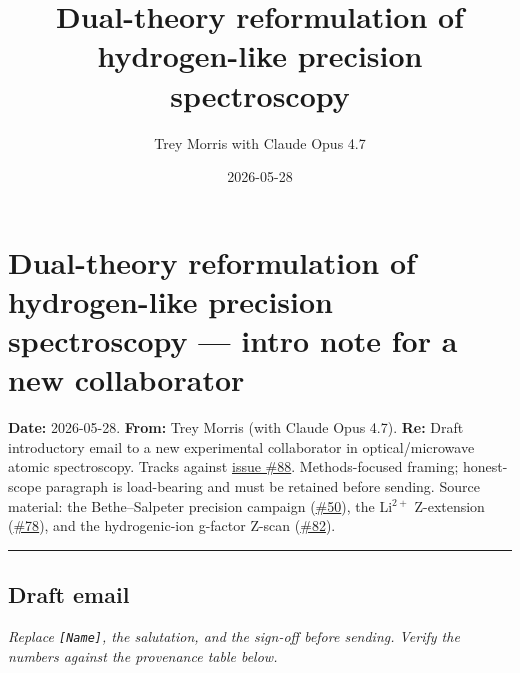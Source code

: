 \documentclass[
  11pt,
]{article}
\title{Dual-theory reformulation of hydrogen-like precision
spectroscopy}
\author{Trey Morris with Claude Opus 4.7}
\date{2026-05-28}
\begin{document}
\maketitle

\hypertarget{dual-theory-reformulation-of-hydrogen-like-precision-spectroscopy-intro-note-for-a-new-collaborator}{%
\section{Dual-theory reformulation of hydrogen-like precision
spectroscopy --- intro note for a new
collaborator}\label{dual-theory-reformulation-of-hydrogen-like-precision-spectroscopy-intro-note-for-a-new-collaborator}}

\textbf{Date:} 2026-05-28. \textbf{From:} Trey Morris (with Claude Opus
4.7). \textbf{Re:} Draft introductory email to a new experimental
collaborator in optical/microwave atomic spectroscopy. Tracks against
\href{https://github.com/temoTxt/PyPhysics/issues/88}{issue \#88}.
Methods-focused framing; honest-scope paragraph is load-bearing and must
be retained before sending. Source material: the Bethe--Salpeter
precision campaign
(\href{https://github.com/temoTxt/PyPhysics/issues/50}{\#50}), the
Li\(^{2+}\) Z-extension
(\href{https://github.com/temoTxt/PyPhysics/issues/78}{\#78}), and the
hydrogenic-ion g-factor Z-scan
(\href{https://github.com/temoTxt/PyPhysics/issues/82}{\#82}).

\begin{center}\rule{0.5\linewidth}{0.5pt}\end{center}

\hypertarget{draft-email}{%
\subsection{Draft email}\label{draft-email}}

\emph{Replace \texttt{{[}Name{]}}, the salutation, and the sign-off
before sending. Verify the numbers against the provenance table below.}
\end{document}
